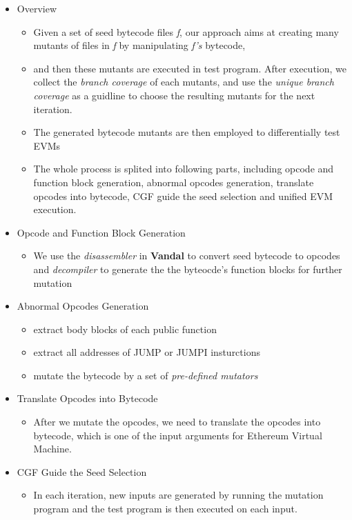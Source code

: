 \documentclass[a4paper]{article}
\begin{document}
	\begin{itemize}
		\item Overview
		\begin{itemize}
			\item Given a set of seed bytecode files \textit{f}, our approach aims at creating many mutants of files in \textit{f} by manipulating \textit{f's} bytecode, 
			\item and then these mutants are executed in test program. After execution, we collect the \textit{branch coverage} of each mutants, and use the \textit{unique branch coverage} as a guidline to choose the resulting mutants for the next iteration.
			\item The generated bytecode mutants are then employed to differentially test EVMs
			\item The whole process is splited into following parts, including opcode and function block generation, abnormal opcodes generation, translate opcodes into bytecode, CGF guide the seed selection and unified EVM execution.
		\end{itemize}
		\item Opcode and Function Block Generation
		\begin{itemize}
			\item We use the \textit{disassembler} in \textbf{Vandal} to convert seed bytecode to opcodes and \textit{decompiler} to generate the the byteocde's function blocks for further mutation
		\end{itemize}
		\item Abnormal Opcodes Generation
		\begin{itemize}
			\item extract body blocks of each public function
			\item extract all addresses of JUMP or JUMPI insturctions
			\item mutate the bytecode by a set of \textit{pre-defined mutators}
		\end{itemize}
		\item Translate Opcodes into Bytecode
		\begin{itemize}
			\item After we mutate the opcodes, we need to translate the opcodes into bytecode, which is one of the input arguments for Ethereum Virtual Machine.
		\end{itemize}
		\item CGF Guide the Seed Selection
		\begin{itemize}
			\item In each iteration, new inputs are generated by running the mutation program and the test program is then executed on each input. 

\end{itemize}
\end{itemize}
\end{document}

